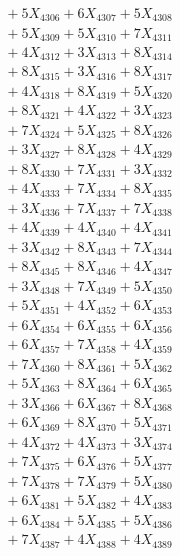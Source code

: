 \documentclass[a4paper,10pt]{article}
\begin{document}
{\begin{align}
&\;  + 5 X_{4306} + 6 X_{4307} + 5 X_{4308} \\[0.3ex]
&\;  + 5 X_{4309} + 5 X_{4310} + 7 X_{4311} \\[0.3ex]
&\;  + 4 X_{4312} + 3 X_{4313} + 8 X_{4314} \\[0.3ex]
&\;  + 8 X_{4315} + 3 X_{4316} + 8 X_{4317} \\[0.3ex]
&\;  + 4 X_{4318} + 8 X_{4319} + 5 X_{4320} \\[0.3ex]
&\;  + 8 X_{4321} + 4 X_{4322} + 3 X_{4323} \\[0.3ex]
&\;  + 7 X_{4324} + 5 X_{4325} + 8 X_{4326} \\[0.3ex]
&\;  + 3 X_{4327} + 8 X_{4328} + 4 X_{4329} \\[0.5ex]\allowbreak
&\;  + 8 X_{4330} + 7 X_{4331} + 3 X_{4332} \\[0.3ex]
&\;  + 4 X_{4333} + 7 X_{4334} + 8 X_{4335} \\[0.3ex]
&\;  + 3 X_{4336} + 7 X_{4337} + 7 X_{4338} \\[0.3ex]
&\;  + 4 X_{4339} + 4 X_{4340} + 4 X_{4341} \\[0.3ex]
&\;  + 3 X_{4342} + 8 X_{4343} + 7 X_{4344} \\[0.3ex]
&\;  + 8 X_{4345} + 8 X_{4346} + 4 X_{4347} \\[0.3ex]
&\;  + 3 X_{4348} + 7 X_{4349} + 5 X_{4350} \\[0.3ex]
&\;  + 5 X_{4351} + 4 X_{4352} + 6 X_{4353} \\[0.3ex]
&\;  + 6 X_{4354} + 6 X_{4355} + 6 X_{4356} \\[0.3ex]
&\;  + 6 X_{4357} + 7 X_{4358} + 4 X_{4359} \\[0.5ex]\allowbreak
&\;  + 7 X_{4360} + 8 X_{4361} + 5 X_{4362} \\[0.3ex]
&\;  + 5 X_{4363} + 8 X_{4364} + 6 X_{4365} \\[0.3ex]
&\;  + 3 X_{4366} + 6 X_{4367} + 8 X_{4368} \\[0.3ex]
&\;  + 6 X_{4369} + 8 X_{4370} + 5 X_{4371} \\[0.3ex]
&\;  + 4 X_{4372} + 4 X_{4373} + 3 X_{4374} \\[0.3ex]
&\;  + 7 X_{4375} + 6 X_{4376} + 5 X_{4377} \\[0.3ex]
&\;  + 7 X_{4378} + 7 X_{4379} + 5 X_{4380} \\[0.3ex]
&\;  + 6 X_{4381} + 5 X_{4382} + 4 X_{4383} \\[0.3ex]
&\;  + 6 X_{4384} + 5 X_{4385} + 5 X_{4386} \\[0.3ex]
&\;  + 7 X_{4387} + 4 X_{4388} + 4 X_{4389} \\[0.5ex]\allowbreak

\end{align}}
\end{document}
